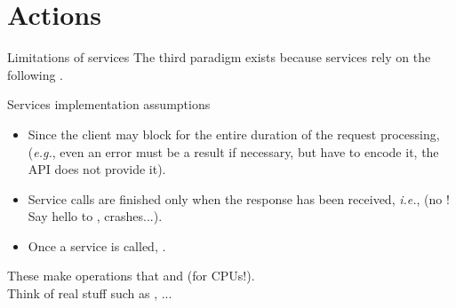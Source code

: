 
\section{Actions}
\graphicspath{{figs/section2/}}

\begin{frame}{Limitations of services}
  The third paradigm exists because services rely on the following .
  \begin{alertblock}{Services implementation assumptions}
    \begin{itemize}
      \item Since the client may block for the entire duration of the request processing,  (\emph{e.g.}, even an error must be a result if necessary, but  have to encode it, the API does not provide it).
      \item Service calls are finished only when the response has been received, \emph{i.e.},  (no ! Say hello to , crashes...).
      \item Once a service is called, .
    \end{itemize}
  \end{alertblock}
  These make  operations that  and  (for CPUs!).\\
  Think of real stuff such as , ...
\end{frame}

